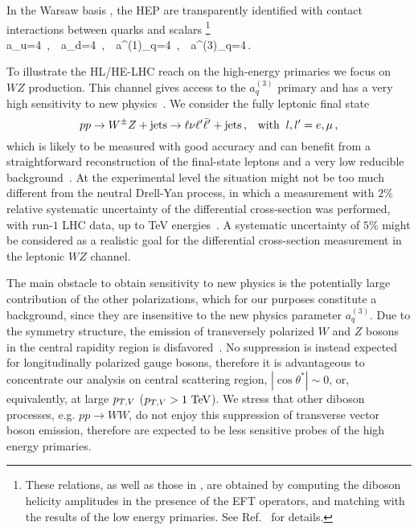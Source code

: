 In the Warsaw basis \cite{Grzadkowski:2010es}, the HEP are transparently identified with contact interactions between quarks and scalars \footnote{These relations, as well as those in  , are obtained by computing the diboson helicity amplitudes in the presence of the EFT operators, and matching with the results of the low energy primaries. See Ref.~\cite{Franceschini:2017ab} for details.}
\be
a_u=4\ ,\  \ a_d=4\ ,\ \  a^{(1)}_q=4\ ,\ \  a^{(3)}_q=4\,.
\ee


To illustrate the HL/HE-LHC reach on the high-energy primaries we focus on $WZ$ production. This channel gives access to the
$a_q^{(3)}$ primary and has a very high sensitivity to new physics~\cite{Franceschini:2017ab}. We consider the fully leptonic final state
$$
pp\to W^{\pm}Z + {\rm{jets}}\to \ell\nu\ell^{\prime}\bar{\ell}^{\prime} + {\rm{jets}} \,, \;\;\; {\rm{with}}\;\;l,l'=e,\mu\,,
$$ 
which is likely to be measured with good accuracy and can benefit from a straightforward reconstruction of the final-state
leptons and a very low reducible background~\cite{Aad:2016ett}. At the experimental level
the situation might not be too much different from the neutral Drell-Yan process, in which a measurement with $2\%$
relative systematic uncertainty of the differential cross-section was performed, with run-$1$ LHC data,
up to TeV energies~\cite{Aad:2016zzw}.
A systematic uncertainty of $5\%$ might be considered as a realistic goal for the differential cross-section measurement in the leptonic $WZ$ channel. 

The main obstacle to obtain sensitivity to new physics is the potentially large contribution of the other polarizations, which for our purposes constitute a background, since they are insensitive to the new physics parameter $a_{q}^{(3)}$. %
Due to the symmetry structure, the emission of transversely polarized $W$ and $Z$ bosons in the central rapidity region is disfavored~\cite{Franceschini:2017ab}. No suppression is instead expected for longitudinally polarized gauge bosons, therefore it is advantageous to concentrate our analysis on central scattering region, $|\cos \theta^*| \sim 0$, or, equivalently, at large $p_{T,V}$ ($p_{T,V} > 1\ {\rm TeV}$). We stress that other diboson processes, e.g. $pp \to WW$, do not enjoy this suppression of transverse vector boson emission, therefore are expected to be less sensitive probes of the high energy primaries. %

